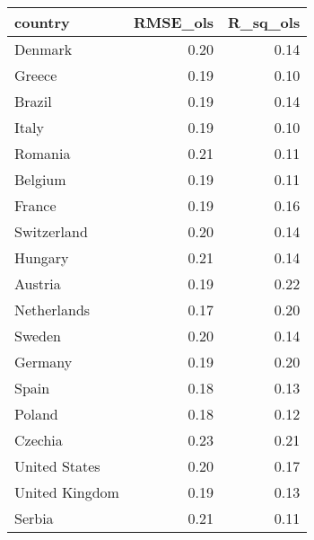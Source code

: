 \begin{table}[ht]
\centering
\begin{tabular}{lrr}
  \hline
country & RMSE\_ols & R\_sq\_ols \\ 
  \hline
Denmark & 0.20 & 0.14 \\ 
  Greece & 0.19 & 0.10 \\ 
  Brazil & 0.19 & 0.14 \\ 
  Italy & 0.19 & 0.10 \\ 
  Romania & 0.21 & 0.11 \\ 
  Belgium & 0.19 & 0.11 \\ 
  France & 0.19 & 0.16 \\ 
  Switzerland & 0.20 & 0.14 \\ 
  Hungary & 0.21 & 0.14 \\ 
  Austria & 0.19 & 0.22 \\ 
  Netherlands & 0.17 & 0.20 \\ 
  Sweden & 0.20 & 0.14 \\ 
  Germany & 0.19 & 0.20 \\ 
  Spain & 0.18 & 0.13 \\ 
  Poland & 0.18 & 0.12 \\ 
  Czechia & 0.23 & 0.21 \\ 
  United States & 0.20 & 0.17 \\ 
  United Kingdom & 0.19 & 0.13 \\ 
  Serbia & 0.21 & 0.11 \\ 
   \hline
\end{tabular}
\end{table}
